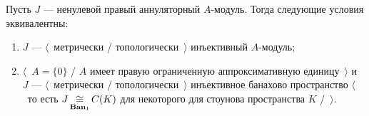 \begin{proposition}\label{MetTopInjOfAnnihModCharac} Пусть $J$ --- ненулевой
правый аннуляторный $A$-модуль. Тогда следующие условия эквивалентны:
\begin{enumerate}[label = (\roman*)]
    \item $J$ --- $\langle$~метрически / топологически~$\rangle$ инъективный
    $A$-модуль;

    \item $\langle$~$A= \{0 \}$ / $A$ имеет правую ограниченную аппроксимативную
    единицу~$\rangle$ и $J$ ---  $\langle$~метрически / топологически~$\rangle$
    инъективное банахово пространство $\langle$~то есть
    $J\mathop{\mathbin{\cong}}\limits_{\mathbf{Ban}_1}C(K)$ для некоторого для стоунова пространства $K$
    /~$\rangle$.
\end{enumerate}
\end{proposition}
